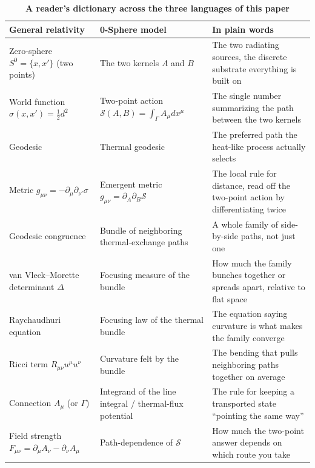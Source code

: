 \documentclass[%
 reprint, amsmath,amssymb, aps, prb, ]{revtex4-2}
\numberwithin{equation}{section}
\begin{document}
\begin{table}[t!]
\centering
\caption{\textbf{A reader's dictionary across the three languages of this paper}}
\label{tab:dictionary}
\renewcommand{\arraystretch}{1.35}
\begin{tabular}{p{4.6cm}p{5.2cm}p{6.0cm}}
\toprule
\textbf{General relativity} & \textbf{0-Sphere model} & \textbf{In plain words} \\
\midrule
Zero-sphere $S^0=\{x,x'\}$ (two points)
& The two kernels $A$ and $B$
& The two radiating sources, the discrete substrate everything is built on \\
\addlinespace[0.2cm]
World function $\sigma(x,x')=\tfrac12 d^2$
& Two-point action $\mathcal{S}(A,B)=\int_\Gamma A_\mu dx^\mu$
& The single number summarizing the path between the two kernels \\
\addlinespace[0.2cm]
Geodesic
& Thermal geodesic
& The preferred path the heat-like process actually selects \\
\addlinespace[0.2cm]
Metric $g_{\mu\nu}=-\partial_\mu\partial_{\nu'}\sigma$
& Emergent metric $g_{\mu\nu}=\partial_{A}\partial_{B}\mathcal{S}$
& The local rule for distance, read off the two-point action by differentiating twice \\
\addlinespace[0.2cm]
Geodesic congruence
& Bundle of neighboring thermal-exchange paths
& A whole family of side-by-side paths, not just one \\
\addlinespace[0.2cm]
van Vleck--Morette determinant $\Delta$
& Focusing measure of the bundle
& How much the family bunches together or spreads apart, relative to flat space \\
\addlinespace[0.2cm]
Raychaudhuri equation
& Focusing law of the thermal bundle
& The equation saying curvature is what makes the family converge \\
\addlinespace[0.2cm]
Ricci term $R_{\mu\nu}u^\mu u^\nu$
& Curvature felt by the bundle
& The bending that pulls neighboring paths together on average \\
\addlinespace[0.2cm]
Connection $A_\mu$ (or $\Gamma$)
& Integrand of the line integral / thermal-flux potential
& The rule for keeping a transported state ``pointing the same way'' \\
\addlinespace[0.2cm]
Field strength $F_{\mu\nu}=\partial_\mu A_\nu-\partial_\nu A_\mu$
& Path-dependence of $\mathcal{S}$
& How much the two-point answer depends on which route you take \\

\end{tabular}
\end{table}
\end{document}
